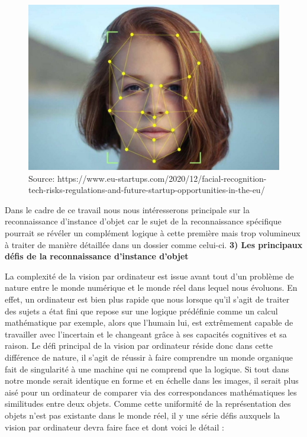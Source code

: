 \documentclass[a4paper,12pt]{article} %
\begin{document}
\begin{figure}[h] %
  \centering %
  \includegraphics[scale=0.45]{face.jpg} %
  \caption{Source: https://www.eu-startups.com/2020/12/facial-recognition-tech-risks-regulations-and-future-startup-opportunities-in-the-eu/ } %
\end{figure}
\newline
\par
Dans le cadre de ce travail nous nous intéresserons principale sur la reconnaissance d’instance d’objet car le sujet de la reconnaissance spécifique pourrait se révéler un complément logique à cette première mais trop volumineux à traiter de manière détaillée dans un dossier comme celui-ci.
\newpage
\textbf{3) Les principaux défis de la reconnaissance d’instance d’objet}
\newline
\par
	La complexité de la vision par ordinateur est issue avant tout d’un problème de nature entre le monde numérique et le monde réel dans lequel nous évoluons. En effet, un ordinateur est bien plus rapide que nous lorsque qu’il s’agit de traiter des sujets a état fini que repose sur une logique prédéfinie comme un calcul mathématique par exemple, alors que l’humain lui, est extrêmement capable de travailler avec l’incertain et le changeant grâce à ses capacités cognitives et sa raison. Le défi principal de la vision par ordinateur réside donc dans cette différence de nature, il s’agit de réussir à faire comprendre un monde organique fait de singularité à une machine qui ne comprend que la logique. Si tout dans notre monde serait identique en forme et en échelle dans les images, il serait plus aisé pour un ordinateur de comparer via des correspondances mathématiques les similitudes entre deux objets. Comme cette uniformité de la représentation des objets n’est pas existante dans le monde réel, il y une série défis auxquels la vision par ordinateur devra faire face et dont voici le détail :\newline
\par
\end{document}
